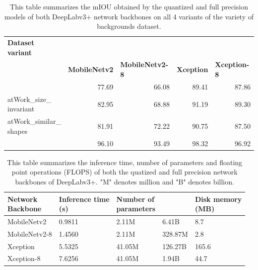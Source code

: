 	\begin{table}[h]
		\begin{tabular}{|l|r|r|r|r|}
		\hline
		\makecell{\textbf{Dataset} \\ \textbf{variant}} & \multicolumn{ 4}{l|}{\makecell{\textbf{mIOU in \%}}} \\ \cline{ 2- 5}
		\multicolumn{ 1}{|l|}{} & \multicolumn{1}{l|}{\textbf{MobileNetv2}} & \multicolumn{1}{l|}{\textbf{MobileNetv2-8}} & \multicolumn{1}{l|}{\textbf{Xception}} & \multicolumn{1}{l|}{\textbf{Xception-8}} \\ \hline
		\makecell{atWork\_full} & 77.69 & 66.08 & 89.41 & 87.86 \\ \hline
		\makecell{atWork\_size\_\\invariant} & 82.95 & 68.88 & 91.19 & 89.30 \\ \hline
		\makecell{atWork\_similar\_\\shapes} & 81.91 & 72.22 & 90.75 & 87.50 \\ \hline
		\makecell{atWork\_binary} & 96.10 & 93.49 & 98.32 & 96.92 \\ \hline
		\end{tabular}
		\caption{This table summarizes the mIOU obtained by the quantized and full precision models of both DeepLabv3+ network backbones on all 4 variants of the variety of backgrounds dataset.}
		\label{Table:quantmIOU}
	\end{table}
	
	\begin{table}[h]
		\centering
		\begin{tabular}{|l|l|l|l|l|}
		\hline
		\makecell{\textbf{Network} \\ \textbf{Backbone}} & \makecell{\textbf{Inference time} \\ \textbf{(s)}} & \makecell{\textbf{Number of} \\ \textbf{parameters}} & \makecell{\textbf{FLOPS}} & \makecell{\textbf{Disk memory} \\ \textbf{(MB)}} \\ \hline
		MobileNetv2 & 0.9811 & 2.11M & 6.41B & 8.7 \\ \hline
		MobileNetv2-8 & 1.4560 & 2.11M & 328.87M & 2.8 \\ \hline
		Xception & 5.5325 & 41.05M & 126.27B & 165.6 \\ \hline
		Xception-8 & 7.6256 & 41.05M & 1.94B & 44.7 \\ \hline
		\end{tabular}
		\caption{This table summarizes the inference time, number of parameters and floating point operations (FLOPS) of both the quatized and full precision network backbones of DeepLabv3+. "M" denotes million and "B" denotes billion.}
		\label{Table:quantMetrics}
	\end{table}
	
